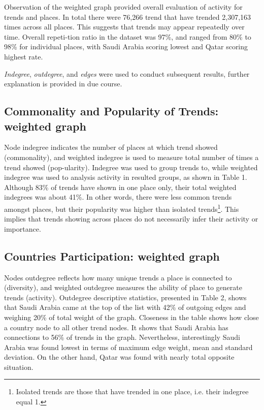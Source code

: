 \documentclass{llncs}
\begin{document}
Observation of the weighted graph provided overall evaluation of
activity for trends and places. In total there were 76,266 trend that
have trended 2,307,163 times across all places. This suggests that
trends may appear repeatedly over time. Overall repeti-tion ratio in
the dataset was 97\%, and ranged from 80\% to 98\% for individual
places, with Saudi Arabia scoring lowest and Qatar scoring highest
rate.

{\emph{Indegree}}, {\emph{outdegree}}, and {\emph{edges}} were used to
conduct subsequent results, further explanation is provided in due
course.


\subsection{Commonality and Popularity of Trends: weighted graph}

Node indegree indicates the number of places at which trend showed
(commonality), and weighted indegree is used to measure total number
of times a trend showed (pop-ularity). Indegree was used to group
trends to, while weighted indegree was used to analysis activity in
resulted groups, as shown in Table 1. Although 83\% of trends have
shown in one place only, their total weighted indegrees was about
41\%. In other words, there were less common trends amongst places,
but their popularity was higher than isolated trends\footnote{Isolated
trends are those that have trended in one place, i.e. their indegree
equal 1.}. This implies that trends showing across places do not
necessarily infer their activity or importance.


\subsection{Countries Participation: weighted graph}

Nodes outdegree reflects how many unique trends a place is connected
to (diversity), and weighted outdegree measures the ability of place
to generate trends (activity). Outdegree descriptive statistics,
presented in Table 2, shows that Saudi Arabia came at the top of the
list with 42\% of outgoing edges and weighing 20\% of total weight of
the graph. Closeness in the table shows how close a country node to
all other trend nodes. It shows that Saudi Arabia has connections to
56\% of trends in the graph. Nevertheless, interestingly Saudi Arabia
was found lowest in terms of maximum edge weight, mean and standard
deviation. On the other hand, Qatar was found with nearly total
opposite situation.
\end{document}
